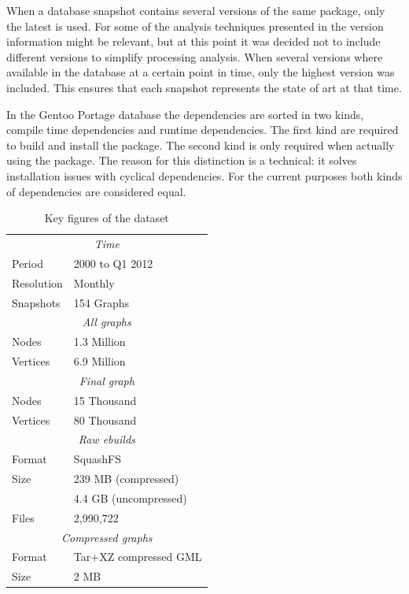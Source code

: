 \documentclass[smallextended,final]{svjour3}
\begin{document}
When a database snapshot contains several versions of the same package, only the latest is used. For some of the analysis techniques presented in the version information might be relevant, but at this point it was decided not to include different versions to simplify processing analysis. When several versions where available in the database at a certain point in time, only the highest version was included. This ensures that each snapshot represents the state of art at that time.

In the Gentoo Portage database the dependencies are sorted in two kinds, compile time dependencies and runtime dependencies. The first kind are required to build and install the package. The second kind is only required when actually using the package. The reason for this distinction is a technical: it solves installation issues with cyclical dependencies. For the current purposes both kinds of dependencies are considered equal.

\begin{table}
\vspace{-1em}
\small\centering
\caption{Key figures of the dataset}\label{tbl:dataset}
\begin{tabular}{ll}
\toprule
\multicolumn{2}{c}{\emph{Time}} \\[0.5mm]
Period & 2000 to Q1 2012 \\
Resolution & Monthly \\
Snapshots & 154 Graphs \\
\midrule
\multicolumn{2}{c}{\emph{All graphs}} \\[0.5mm]
Nodes & 1.3 Million \\
Vertices & 6.9 Million \\
\midrule
\multicolumn{2}{c}{\emph{Final graph}} \\[0.5mm]
Nodes & 15 Thousand \\
Vertices & 80 Thousand \\
\midrule
\multicolumn{2}{c}{\emph{Raw ebuilds}} \\[0.5mm]
Format & SquashFS \\
Size & 239 MB (compressed) \\
 & 4.4 GB (uncompressed) \\
Files & 2,990,722 \\
\midrule
\multicolumn{2}{c}{\emph{Compressed graphs}} \\[0.5mm]
Format & Tar+XZ compressed GML \\
Size & 2 MB \\
\bottomrule
\end{tabular}
\vspace{-1em}
\end{table}
\end{document}
